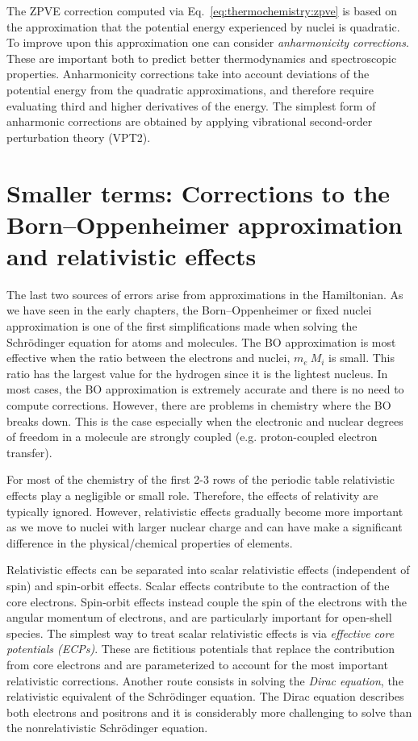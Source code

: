 \documentclass[../Main/chem371-notes.tex]{subfiles}
\begin{document}
The ZPVE correction computed via Eq.~\eqref{eq:thermochemistry:zpve} is based on the approximation that the potential energy experienced by nuclei is quadratic.
To improve upon this approximation one can consider \emph{anharmonicity corrections}.
These are important both to predict better thermodynamics and spectroscopic properties.
Anharmonicity corrections take into account deviations of the potential energy from the quadratic approximations, and therefore require evaluating third and higher derivatives of the energy.
The simplest form of anharmonic corrections are obtained by applying vibrational  second-order perturbation theory (VPT2).

\section{Smaller terms: Corrections to the Born--Oppenheimer approximation and relativistic effects}

The last two sources of errors arise from approximations in the Hamiltonian.
As we have seen in the early chapters, the Born--Oppenheimer or fixed nuclei approximation is one of the first simplifications made when solving the Schr\"{o}dinger equation for atoms and molecules.
The BO approximation is most effective when the ratio between the electrons and nuclei, $m_e \ M_i$ is small.
This ratio has the largest value for the hydrogen since it is the lightest nucleus.
In most cases, the BO approximation is extremely accurate and there is no need to compute corrections.
However, there are problems in chemistry where the BO breaks down.
This is the case especially when the electronic and nuclear degrees of freedom in a molecule are strongly coupled (e.g. proton-coupled electron transfer).

For most of the chemistry of the first 2-3 rows of the periodic table relativistic effects play a negligible or small role.
Therefore, the effects of relativity are typically ignored.
However, relativistic effects gradually become more important as we move to nuclei with larger nuclear charge and can have make a significant difference in the physical/chemical properties of elements.

Relativistic effects can be separated into scalar relativistic effects (independent of spin) and spin-orbit effects.
Scalar effects contribute to the contraction of the core electrons.
Spin-orbit effects instead couple the spin of the electrons with the angular momentum of electrons, and are particularly important for open-shell species.
The simplest way to treat scalar relativistic effects is via \emph{effective core potentials (ECPs)}.
These are fictitious potentials that replace the contribution from core electrons and are parameterized to account for the most important relativistic corrections.
Another route consists in solving the \emph{Dirac equation}, the relativistic equivalent of the Schr\"{o}dinger equation.
The Dirac equation describes both electrons and positrons and it is considerably more challenging to solve than the nonrelativistic Schr\"{o}dinger equation.
\end{document}
